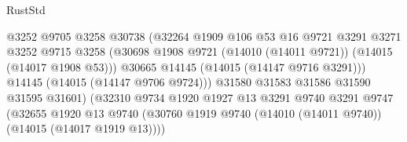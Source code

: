 \begin{lexlean}{RustStd}
\begin{coremodule}
                                            @3252
                                            @9705
                                            @3258
                                            @30738
                                            (@32264
                                              @1909
                                              @106
                                              @53
                                              @16
                                              @9721
                                              @3291
                                              @3271
                                              @3252
                                              @9715
                                              @3258
                                              (@30698
                                                @1908
                                                @9721
                                                (@14010 (@14011 @9721))
                                                (@14015 (@14017 @1908 @53)))
                                              @30665
                                              @14145
                                              (@14015 (@14147 @9716 @3291)))
                                            @14145
                                            (@14015 (@14147 @9706 @9724)))
                                          @31580
                                          @31583
                                          @31586
                                          @31590
                                          @31595
                                          @31601)
                                        (@32310
                                          @9734
                                          @1920
                                          @1927
                                          @13
                                          @3291
                                          @9740
                                          @3291
                                          @9747
                                          (@32655
                                            @1920
                                            @13
                                            @9740
                                            (@30760
                                              @1919
                                              @9740
                                              (@14010 (@14011 @9740))
                                              (@14015 (@14017 @1919 @13))))

\end{coremodule}
\end{lexlean}
